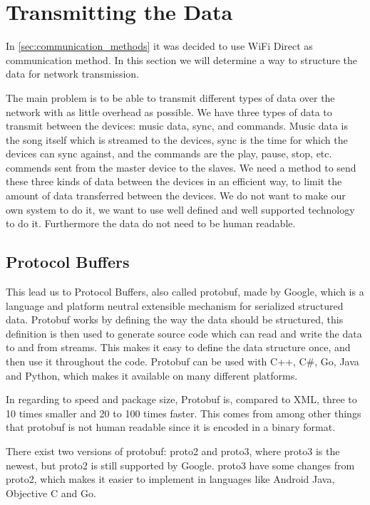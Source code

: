 \section{Transmitting the Data}
In \cref{sec:communication_methods} it was decided to use WiFi Direct as communication method.
In this section we will determine a way to structure the data for network transmission.

\bigskip

The main problem is to be able to transmit different types of data over the network with as little overhead as possible.
We have three types of data to transmit between the devices: music data, sync, and commands. 
Music data is the song itself which is streamed to the devices,
sync is the time for which the devices can sync against, and the commands are the play, pause, stop, etc. commends sent from the master device to the slaves. 
We need a method to send these three kinds of data between the devices in an efficient way,
to limit the amount of data transferred between the devices.
We do not want to make our own system to do it, we want to use well defined and well supported technology to do it.
Furthermore the data do not need to be human readable.

\subsection{Protocol Buffers}
This lead us to Protocol Buffers, also called protobuf, made by Google, which is a language and platform neutral extensible mechanism for serialized structured data. 
Protobuf works by defining the way the data should be structured, this definition is then used to generate source code which can read and write the data to and from streams.\cite{protobuf}
This makes it easy to define the data structure once, and then use it throughout the code.
Protobuf can be used with C++, C\#, Go, Java and Python, which makes it available on many different platforms\cite{protobuf}.

In regarding to speed and package size, Protobuf is, compared to XML, three to 10 times smaller and 20 to 100 times faster.
This comes from among other things that protobuf is not human readable since it is encoded in a binary format.\cite{protobuf} 

There exist two versions of protobuf: proto2 and proto3, where proto3 is the newest, but proto2 is still supported by Google.
proto3 have some changes from proto2, which makes it easier to implement in languages like Android Java, Objective C and Go.\cite{proto3}

